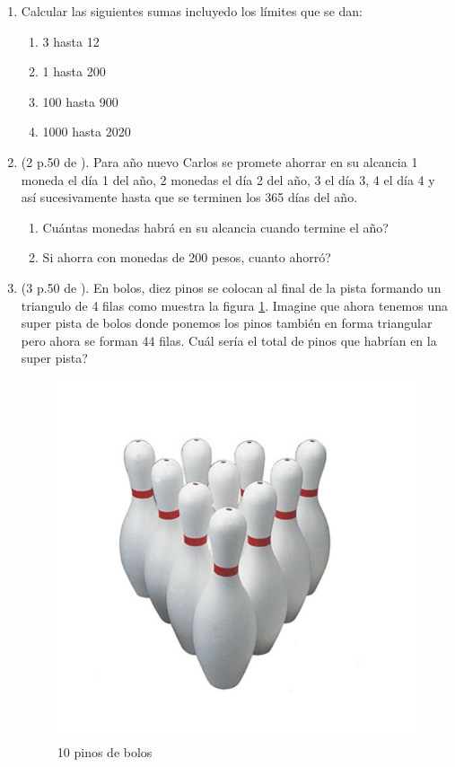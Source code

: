 \begin{enumerate}
	\item Calcular las siguientes sumas incluyedo los límites que se dan:
			\begin{multicols}{2}
			\begin{enumerate}[label=\Alph*)]
				\item 3 hasta 12
				\item 1 hasta 200					
				\item 100 hasta 900
				\item 1000 hasta 2020
			\end{enumerate}
			\end{multicols}
			
	\item (2 p.50 de \cite{creative_problem_solvind_NEGRO}). Para año nuevo Carlos se promete ahorrar en su alcancia 1 moneda el día 1 del año, 2 monedas el día 2 del año, 3 el día 3, 4 el día 4 y así sucesivamente hasta que se terminen los 365 días del año.
			\begin{enumerate}[label=\Alph*)]
			\item Cuántas monedas habrá en su alcancia cuando termine el año? 
			\item Si ahorra con monedas de 200 pesos, cuanto ahorró?
			\end{enumerate}
	
	\item (3 p.50 de \cite{creative_problem_solvind_NEGRO}).  En bolos, diez pinos se colocan al final de la pista formando un triangulo de 4 filas como muestra la figura \ref{bolospinos}. Imagine que ahora tenemos una super pista de bolos donde ponemos los pinos también en forma triangular pero ahora se forman 44 filas. Cuál sería el total de pinos que habrían en la super pista? 
	
		\begin{figure}[H]
			\centering
			\includegraphics[width=0.4\linewidth]{TN/imgs/bolos_pinos}
			\caption{10 pinos de bolos}
			\label{bolospinos}
		\end{figure}
	

\end{enumerate}
